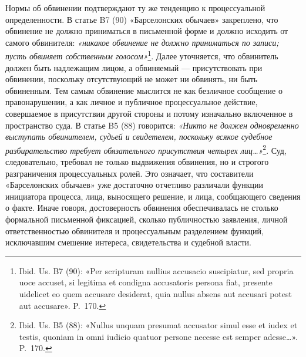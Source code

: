Нормы об обвинении подтверждают ту же тенденцию к процессуальной определенности. В статье B7 (90) «Барселонских обычаев» закреплено, что обвинение не должно приниматься в письменной форме и должно исходить от самого обвинителя: \emph{«никакое обвинение не должно приниматься по записи; пусть обвиняет собственным голосом»}\footnote{Ibid. Us. B7 (90): «Per scripturam nullius accusacio suscipiatur, sed propria uoce accuset, si legitima et condigna accusatoris persona fiat, presente uidelicet eo quem accusare desiderat, quia nullus absens aut accusari potest aut accusare». P.~170.}. Далее уточняется, что обвинитель должен быть надлежащим лицом, а обвиняемый --- присутствовать при обвинении, поскольку отсутствующий не может ни обвинять, ни быть обвиненным. Тем самым обвинение мыслится не как безличное сообщение о правонарушении, а как личное и публичное процессуальное действие, совершаемое в присутствии другой стороны и потому изначально включенное в пространство суда. В статье B5 (88) говорится: \emph{«Никто не должен одновременно выступать обвинителем, судьей и свидетелем, поскольку всякое судебное разбирательство требует обязательного присутствия четырех лиц…»}\footnote{Ibid. Us. B5 (88): «Nullus unquam presumat accusator simul esse et iudex et testis, quoniam in omni iudicio quatuor persone necesse est semper adesse…». P.~170.}. Суд, следовательно, требовал не только выдвижения обвинения, но и строгого разграничения процессуальных ролей. Это означает, что составители «Барселонских обычаев» уже достаточно отчетливо различали функции инициатора процесса, лица, выносящего решение, и лица, сообщающего сведения о факте. Иначе говоря, достоверность обвинения обеспечивалась не столько формальной письменной фиксацией, сколько публичностью заявления, личной ответственностью обвинителя и процессуальным разделением функций, исключавшим смешение интереса, свидетельства и судебной власти.

